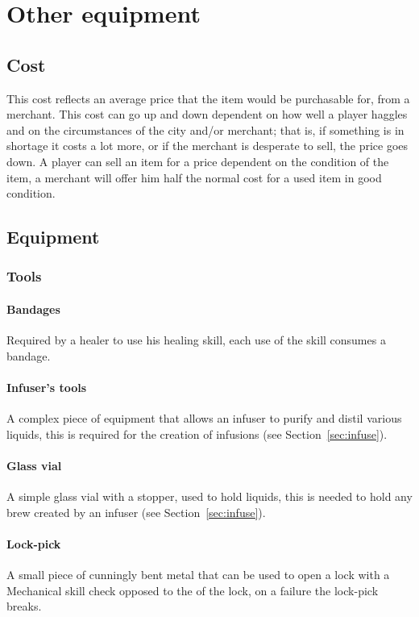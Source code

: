 \documentclass[a4paper,11pt,oneside]{book}
\newcommand{\textlf}[1]{\textbf{\titlecap{#1}}}
\begin{document}
\chapter{Other equipment}


\section{Cost}
This cost reflects an average price that the item would be purchasable for, from a merchant. This cost can go up and down dependent on how well a player haggles and on the circumstances of the city and/or merchant; that is, if something is in shortage it costs a lot more, or if the merchant is desperate to sell, the price goes down. A player can sell an item for a price dependent on the condition of the item, a merchant will offer him half the normal cost for a used item in good condition.

\section{Equipment}
\subsection{Tools}

\subsubsection*{Bandages}
Required by a healer to use his healing skill, each use of the skill consumes a bandage.

\subsubsection*{Infuser's tools}
A complex piece of equipment that allows an infuser to purify and distil various liquids, this is required for the creation of infusions (see Section~\ref{sec:infuse}).

\subsubsection*{Glass vial}
A simple glass vial with a stopper, used to hold liquids, this is needed to hold any brew created by an infuser (see Section~\ref{sec:infuse}).

\subsubsection*{Lock-pick}
A small piece of cunningly bent metal that can be used to open a lock with a Mechanical skill check opposed to the \textlf{difficulty} of the lock, on a failure the lock-pick breaks.
\end{document}
